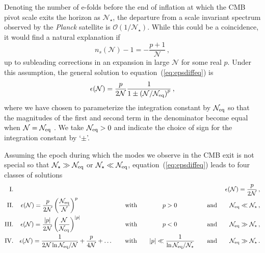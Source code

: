 Denoting the number of e-folds before the end of inflation at which the CMB pivot scale exits the horizon as $\mathcal{N}_\star$, the departure from a scale invariant spectrum observed by the {\it Planck} satellite is $\mathcal{O}(1/\mathcal{N}_\star)$. While this could be a coincidence, it would find a natural explanation if 
\begin{equation}\label{eq:nsassump}
n_s(\mathcal{N})-1=-\frac{p+1}{\mathcal{N}}\,,
\end{equation}
up to subleading corrections in an expansion in large $\mathcal{N}$ for some real $p$. Under this assumption, the general solution to equation~(\ref{eq:epsdiffeq}) is
\begin{equation}\label{eq:epssol}
\epsilon(\mathcal{N})=\frac{p}{2\mathcal{N}}\frac{1}{1\pm\left(\mathcal{N}/\mathcal{N}_{\rm eq}\right)^{p}}\,,
\end{equation}
where we have chosen to parameterize the integration constant by $\mathcal{N}_{\rm eq}$ so that the magnitudes of the first and second term in the denominator become equal when $\mathcal{N}=\mathcal{N}_{\rm eq}$ . We take $\mathcal{N}_{\rm eq}>0$ and indicate the choice of sign for the integration constant by `$\pm$'. 

Assuming the epoch during which the modes we observe in the CMB exit is not special so that $\mathcal{N}_\star\gg\mathcal{N}_{\rm eq}$ or $\mathcal{N}_\star\ll\mathcal{N}_{\rm eq}$, equation~(\ref{eq:epsdiffeq}) leads to four classes of solutions
\begin{eqnarray}
{\rm I.}&&\epsilon(\mathcal{N})=\frac{p}{2\mathcal{N}}\,,\label{eq:classI}\\
{\rm II.}&&\epsilon(\mathcal{N})=\frac{p}{2\mathcal{N}}\left(\frac{\mathcal{N}_{\rm eq}}{\mathcal{N}}\right)^p\hspace{1.92cm}\qquad{\rm with}\qquad \hspace{7.3mm}p>0 \hspace{1.0cm}\qquad{\rm and}\qquad\mathcal{N}_{\rm eq}\ll\mathcal{N}_\star\,,\label{eq:classII}\\
{\rm III.}&&\epsilon(\mathcal{N})=\frac{|p|}{2\mathcal{N}}\left(\frac{\mathcal{N}}{\mathcal{N}_{\rm eq}}\right)^{|p|}\hspace{1.77cm}\qquad{\rm with}\qquad \hspace{7.3mm}p<0 \hspace{1.0cm}\qquad{\rm and}\qquad\mathcal{N}_{\rm eq}\gg\mathcal{N}_\star\,,\label{eq:classIII}\\
{\rm IV.}&&\epsilon(\mathcal{N})=\frac{1}{2\mathcal{N}\ln\mathcal{N}_{\rm eq}/\mathcal{N}}+\frac{p}{4\mathcal{N}}+\dots\qquad{\rm with}\qquad |p|\ll\frac{1}{\ln\mathcal{N}_{\rm eq}/\mathcal{N}_\star}\qquad{\rm and}\qquad \mathcal{N}_{\rm eq}\gg\mathcal{N}_\star\,.\label{eq:classIV}
\end{eqnarray}

